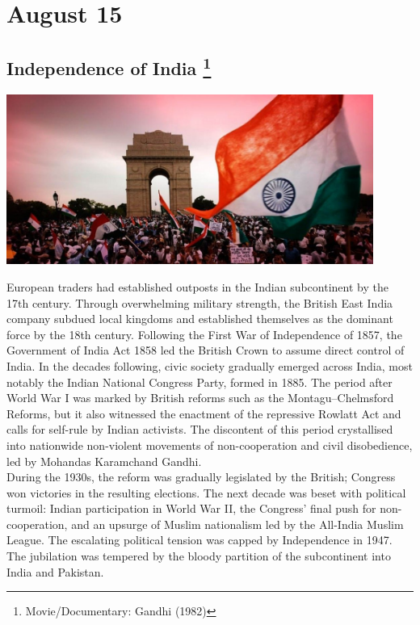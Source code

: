 \documentclass[11pt]{report}
\begin{document}
\section{August 15}
\subsection{Independence of India \protect\footnote{Movie/Documentary: Gandhi (1982)}}
\vspace{2mm}\begin{center}\includegraphics[width=12cm]{./img/independenceIndia.jpg}\end{center}
European traders had established outposts in the Indian subcontinent by the 17th century. Through overwhelming military strength, the British East India company subdued local kingdoms and established themselves as the dominant force by the 18th century. Following the First War of Independence of 1857, the Government of India Act 1858 led the British Crown to assume direct control of India. In the decades following, civic society gradually emerged across India, most notably the Indian National Congress Party, formed in 1885. The period after World War I was marked by British reforms such as the Montagu–Chelmsford Reforms, but it also witnessed the enactment of the repressive Rowlatt Act and calls for self-rule by Indian activists. The discontent of this period crystallised into nationwide non-violent movements of non-cooperation and civil disobedience, led by Mohandas Karamchand Gandhi.\\
\indent During the 1930s, the reform was gradually legislated by the British; Congress won victories in the resulting elections. The next decade was beset with political turmoil: Indian participation in World War II, the Congress' final push for non-cooperation, and an upsurge of Muslim nationalism led by the All-India Muslim League. The escalating political tension was capped by Independence in 1947. The jubilation was tempered by the bloody partition of the subcontinent into India and Pakistan.
\end{document}
